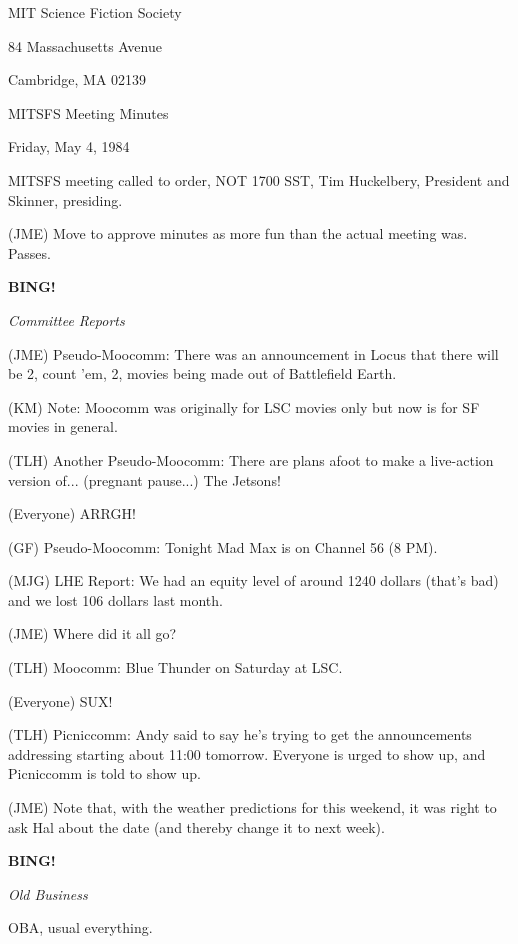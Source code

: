\documentclass[12pt]{article}
\newcommand{\bing}{{\bf BING!} }
\newcommand{\goto}[1]{\bing \vskip 12pt \centerline{{\em{#1}}}}
\begin{document}
\begin{center}

MIT Science Fiction Society 

84 Massachusetts Avenue

Cambridge, MA 02139

\vspace{12pt}

MITSFS Meeting Minutes 

Friday, May 4, 1984

\end{center}
 
\vspace{18pt}

\setlength{\parskip}{6pt}

\noindent
MITSFS meeting called to order, NOT 1700 SST,
Tim Huckelbery, President and Skinner, presiding.

(JME) Move to approve minutes as more fun than the actual meeting was. Passes.

\goto{Committee Reports}

(JME) Pseudo-Moocomm: There was an announcement in Locus that there will be 2, count 'em, 2, movies being made out of Battlefield Earth.

(KM) Note: Moocomm was originally for LSC movies only but now is for SF movies in general.

(TLH) Another Pseudo-Moocomm: There are plans afoot to make a live-action version of... (pregnant pause...) The Jetsons!

(Everyone) ARRGH!

(GF) Pseudo-Moocomm: Tonight Mad Max is on Channel 56 (8 PM).

(MJG) LHE Report: We had an equity level of around 1240 dollars (that's bad) and we lost 106 dollars last month.

(JME) Where did it all go?

(TLH) Moocomm: Blue Thunder on Saturday at LSC.

(Everyone) SUX!

(TLH) Picniccomm: Andy said to say he's trying to get the announcements addressing starting about 11:00 tomorrow. Everyone is urged to show up, and Picniccomm is told to show up.

(JME) Note that, with the weather predictions for this weekend, it was right to ask Hal about the date (and thereby change it to next week).

\goto{Old Business}

OBA, usual everything.
\end{document}
